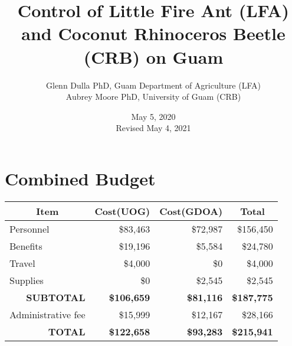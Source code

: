 \documentclass[12pt,letterpaper,english,bibliography=totocnumbered, abstract=on]{scrartcl}
\begin{document}
\titlehead{Work Plan: USDA Forest Service FY2020}

\title{Control of Little Fire Ant (LFA) and Coconut Rhinoceros Beetle (CRB) on Guam}

\author{Glenn Dulla PhD, Guam Department of Agriculture (LFA)\\
	Aubrey Moore PhD, University of Guam (CRB)}

\date{May 5, 2020\\Revised May 4, 2021}

\maketitle
\newpage
\tableofcontents

\pagebreak

\section{Combined Budget}

\begin{table}[h]
	\centering
	\begin{tabular}{@{}lrrr@{}}
		\toprule
		\multicolumn{1}{c}{\textbf{Item}} & \multicolumn{1}{c}{\textbf{Cost(UOG)}} & \multicolumn{1}{c}{\textbf{Cost(GDOA)}} & \multicolumn{1}{c}{\textbf{Total}} \\ 
		\midrule
		Personnel & \$83,463 & \$72,987 & \$156,450 \\
		Benefits  & \$19,196 & \$5,584 & \$24,780 \\
		Travel & \$4,000 & \$0 & \$4,000 \\
		Supplies & \$0 & \$2,545 & \$2,545 \\ 
		\midrule
		\multicolumn{1}{r}{\textbf{SUBTOTAL}} & \textbf{\$106,659} & \textbf{\$81,116} & \textbf{\$187,775} \\ \midrule
		Administrative fee & \$15,999 & \$12,167 & \$28,166 \\ \midrule
		\multicolumn{1}{r}{\textbf{TOTAL}} & \textbf{\$122,658} & \textbf{\$93,283} & \textbf{\$215,941} \\ \bottomrule
	\end{tabular}
\end{table}
\end{document}
